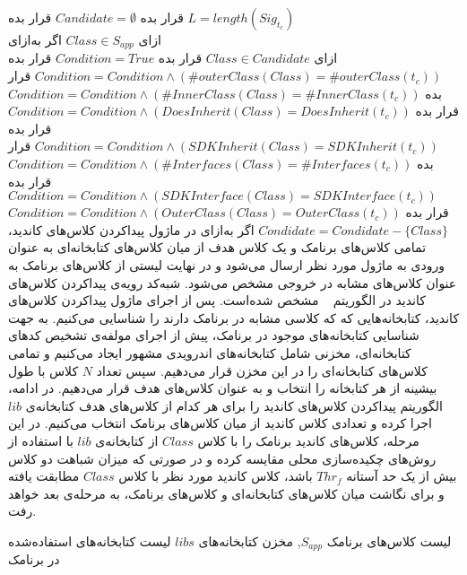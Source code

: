  قرار بده $Candidate = \emptyset$ 
 قرار بده $L= length(Sig_{t_c})$  \\
‌ازای $Class \in S_{app}$ 
‌اگر
‌به‌ازای\\
‌ازای $Class \in Candidate$ 
 قرار بده $Condition = True$
 قرار بده $Condition= Condition \wedge (\#outerClass(Class) = \#outerClass(t_c))$
 قرار بده $Condition= Condition \wedge (\#InnerClass(Class) = \#InnerClass(t_c))$
 قرار بده $Condition= Condition \wedge (DoesInherit(Class) = DoesInherit(t_c))$
 قرار بده $Condition= Condition \wedge (SDKInherit(Class) = SDKInherit(t_c))$
 قرار بده $Condition= Condition \wedge (\#Interfaces(Class) = \#Interfaces(t_c))$
 قرار بده $Condition= Condition \wedge (SDKInterface(Class) = SDKInterface(t_c))$
 قرار بده $Condition= Condition \wedge (OuterClass(Class) = OuterClass(t_c))$
$Condidate=Condidate - \{Class\}$
‌اگر
‌به‌ازای
در ماژول پیداکردن کلاس‌های کاندید، تمامی کلاس‌های برنامک و یک کلاس هدف از میان کلاس‌های کتابخانه‌ای به عنوان ورودی به ماژول مورد نظر ارسال می‌شود و در نهایت لیستی از کلاس‌های برنامک به عنوان کلاس‌های مشابه در خروجی مشخص می‌شود. شبه‌کد رویه‌ی پیداکردن کلاس‌های کاندید در الگوریتم ~ مشخص شده‌است. پس از اجرای ماژول پیدا‌کردن کلاس‌های کاندید،‌ کتابخانه‌هایی که که کلاسی مشابه در برنامک‌ دارند را شناسایی می‌کنیم. به جهت شناسایی کتابخانه‌‌های موجود در برنامک، پیش از اجرای مولفه‌ی تشخیص کد‌های کتابخانه‌ای، مخزنی شامل کتابخانه‌های اندرویدی مشهور ایجاد می‌کنیم و تمامی کلاس‌های کتابخانه‌ای را در این مخزن قرار می‌دهیم. سپس تعداد $N$ کلاس با طول بیشینه از هر کتابخانه‌ را انتخاب و به عنوان کلاس‌های هدف قرار می‌دهیم. در ادامه، الگوریتم پیدا‌کردن کلاس‌های کاندید را برای هر کدام از کلاس‌های هدف کتابخانه‌ی $lib$ اجرا کرده و تعدادی کلاس کاندید از میان کلاس‌های برنامک انتخاب می‌کنیم. در این مرحله، کلاس‌های کاندید برنامک را با کلاس $Class$ از کتابخانه‌ی $lib$ با استفاده از روش‌های چکیده‌سازی محلی مقایسه کرده و در صورتی که میزان شباهت دو کلاس بیش از یک حد آستانه $Thr_f$ باشد، کلاس کاندید مورد نظر با کلاس $Class$ مطابقت یافته و برای نگاشت میان کلاس‌های کتابخانه‌ای و کلاس‌های برنامک، به مرحله‌ی بعد خواهد رفت.


 لیست کلاس‌های برنامک $S_{app}$, مخزن کتابخانه‌های $libs$
 لیست کتابخانه‌های استفاده‌شده در برنامک 


